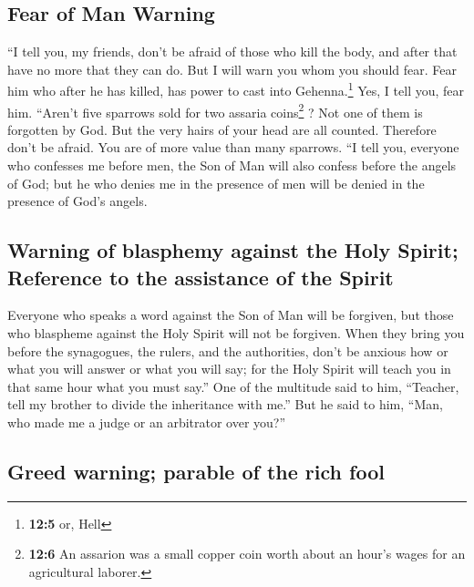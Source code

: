 \hypertarget{fear-of-man-warning}{%
\subsection{Fear of Man Warning}\label{fear-of-man-warning}}

 ``I tell you, my friends, don't be afraid of those who
kill the body, and after that have no more that they can do.
 But I will warn you whom you should fear. Fear him who
after he has killed, has power to cast into Gehenna.\footnote{\textbf{12:5}
  or, Hell} Yes, I tell you, fear him.  ``Aren't five
sparrows sold for two assaria coins\footnote{\textbf{12:6} An assarion
  was a small copper coin worth about an hour's wages for an
  agricultural laborer.} ? Not one of them is forgotten by God.
 But the very hairs of your head are all counted.
Therefore don't be afraid. You are of more value than many sparrows.
 ``I tell you, everyone who confesses me before men, the
Son of Man will also confess before the angels of God; 
but he who denies me in the presence of men will be denied in the
presence of God's angels.

\hypertarget{warning-of-blasphemy-against-the-holy-spirit-reference-to-the-assistance-of-the-spirit}{%
\subsection{Warning of blasphemy against the Holy Spirit; Reference to
the assistance of the
Spirit}\label{warning-of-blasphemy-against-the-holy-spirit-reference-to-the-assistance-of-the-spirit}}

 Everyone who speaks a word against the Son of Man will
be forgiven, but those who blaspheme against the Holy Spirit will not be
forgiven.  When they bring you before the synagogues, the
rulers, and the authorities, don't be anxious how or what you will
answer or what you will say;  for the Holy Spirit will
teach you in that same hour what you must say.''  One of
the multitude said to him, ``Teacher, tell my brother to divide the
inheritance with me.''  But he said to him, ``Man, who
made me a judge or an arbitrator over you?''

\hypertarget{greed-warning-parable-of-the-rich-fool}{%
\subsection{Greed warning; parable of the rich
fool}\label{greed-warning-parable-of-the-rich-fool}}

